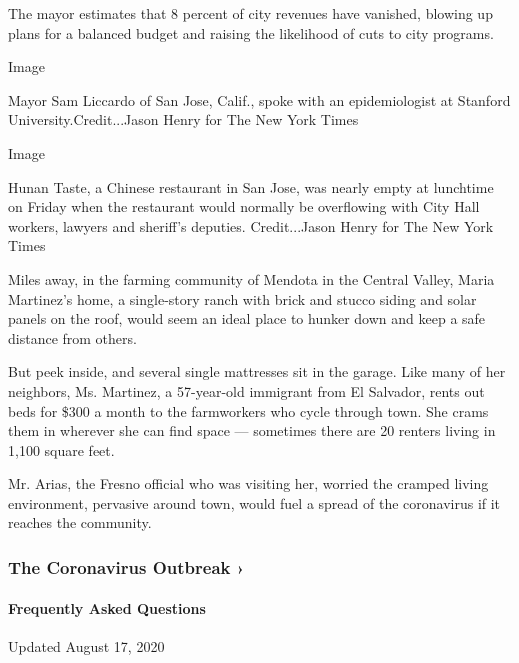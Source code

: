 The mayor estimates that 8 percent of city revenues have vanished,
blowing up plans for a balanced budget and raising the likelihood of
cuts to city programs.

Image

Mayor Sam Liccardo of San Jose, Calif., spoke with an epidemiologist at
Stanford University.Credit...Jason Henry for The New York Times

Image

Hunan Taste, a Chinese restaurant in San Jose, was nearly empty at
lunchtime on Friday when the restaurant would normally be overflowing
with City Hall workers, lawyers and sheriff's deputies. Credit...Jason
Henry for The New York Times

Miles away, in the farming community of Mendota in the Central Valley,
Maria Martinez's home, a single-story ranch with brick and stucco siding
and solar panels on the roof, would seem an ideal place to hunker down
and keep a safe distance from others.

But peek inside, and several single mattresses sit in the garage. Like
many of her neighbors, Ms. Martinez, a 57-year-old immigrant from El
Salvador, rents out beds for \$300 a month to the farmworkers who cycle
through town. She crams them in wherever she can find space ---
sometimes there are 20 renters living in 1,100 square feet.

Mr. Arias, the Fresno official who was visiting her, worried the cramped
living environment, pervasive around town, would fuel a spread of the
coronavirus if it reaches the community.

\href{https://www.nytimes3xbfgragh.onion/news-event/coronavirus?action=click\&pgtype=Article\&state=default\&region=MAIN_CONTENT_3\&context=storylines_faq}{}

\hypertarget{the-coronavirus-outbreak-}{%
\subsubsection{The Coronavirus Outbreak
›}\label{the-coronavirus-outbreak-}}

\hypertarget{frequently-asked-questions}{%
\paragraph{Frequently Asked
Questions}\label{frequently-asked-questions}}

Updated August 17, 2020

